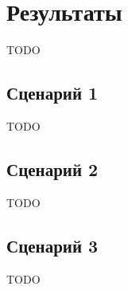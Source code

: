 \chapter{Результаты}

TODO

\section{Сценарий 1}

TODO

\section{Сценарий 2}

TODO

\section{Сценарий 3}

TODO

\newpage
